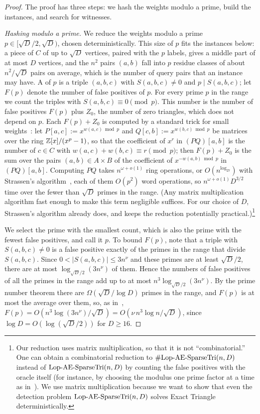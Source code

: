 \begin{proof}
The proof has three steps: we hash the weights modulo a prime, build the instances, and search for witnesses.

\emph{Hashing modulo a prime.} We reduce the weights modulo a prime $p\in[\sqrt D/2,\sqrt D)$, chosen deterministically. This size of $p$ fits the instances below: a piece of $C$ of up to $\sqrt D$ vertices, paired with the $p$ labels, gives a middle part of at most $D$ vertices, and the $n^2$ pairs $(a,b)$ fall into $p$ residue classes of about $n^2/\sqrt D$ pairs on average, which is the number of query pairs that an instance may have. A  of $p$ is a triple $(a,b,c)$ with $S(a,b,c)\ne0$ and $p\mid S(a,b,c)$; let $F(p)$ denote the number of false positives of $p$. For every prime $p$ in the range we count the triples with $S(a,b,c)\equiv0\pmod p$. This number is the number of false positives $F(p)$ plus $Z_0$, the number of zero triangles, which does not depend on $p$. Each $F(p)+Z_0$ is computed by a standard trick for small weights~\cite{AGM97,Zwi02}: let $P[a,c]:=x^{w(a,c)\bmod p}$ and $Q[c,b]:=x^{w(b,c)\bmod p}$ be matrices over the ring $\mathbb{Z}[x]/(x^p-1)$, so that the coefficient of $x^r$ in $(PQ)[a,b]$ is the number of $c\in C$ with $w(a,c)+w(b,c)\equiv r\pmod p$; then $F(p)+Z_0$ is the sum over the pairs $(a,b)\in A\times B$ of the coefficient of $x^{-w(a,b)\bmod p}$ in $(PQ)[a,b]$. Computing $PQ$ takes $n^{\omega+o(1)}$ ring operations, or $O(n^{\log_27})$ with Strassen's algorithm~\cite{Str69}, each of them $O(p^2)$ word operations, so $n^{\omega+o(1)}D^{3/2}$ time over the fewer than $\sqrt D$ primes in the range. (Any matrix multiplication algorithm fast enough to make this term negligible suffices. For our choice of $D$, Strassen's algorithm already does, and keeps the reduction potentially practical.)\footnote{Our reduction uses matrix multiplication, so that it is not ``combinatorial.'' One can obtain a combinatorial reduction to $\#\mathrm{Lop}\text{-}\mathrm{AE}\text{-}\mathrm{SparseTri}(n,D)$ instead of $\mathrm{Lop}\text{-}\mathrm{AE}\text{-}\mathrm{SparseTri}(n,D)$ by counting the false positives with the oracle itself (for instance, by choosing the modulus one prime factor at a time as in~\cite[Lemma~3.2]{FKP24}). We use matrix multiplication because we want to show that even the detection problem $\mathrm{Lop}\text{-}\mathrm{AE}\text{-}\mathrm{SparseTri}(n,D)$ solves Exact Triangle deterministically.}

We select the prime with the smallest count, which is also the prime with the fewest false positives, and call it $p$. To bound $F(p)$, note that a triple with $S(a,b,c)\ne0$ is a false positive exactly of the primes in the range that divide $S(a,b,c)$. Since $0<|S(a,b,c)|\le3n^\nu$ and these primes are at least $\sqrt D/2$, there are at most $\log_{\sqrt D/2}(3n^\nu)$ of them. Hence the numbers of false positives of all the primes in the range add up to at most $n^3\log_{\sqrt D/2}(3n^\nu)$. 
By the prime number theorem there are $\Omega(\sqrt D/\log D)$ primes in the range, and $F(p)$ is at most the average over them, so, as in~\cite[Lemma~3.2]{FKP24}, $F(p)=O(n^3\log(3n^\nu)/\sqrt D)=O(\nu\,n^3\log n/\sqrt D)$, since $\log D=O(\log(\sqrt D/2))$ for $D\ge16$.


\end{proof}
